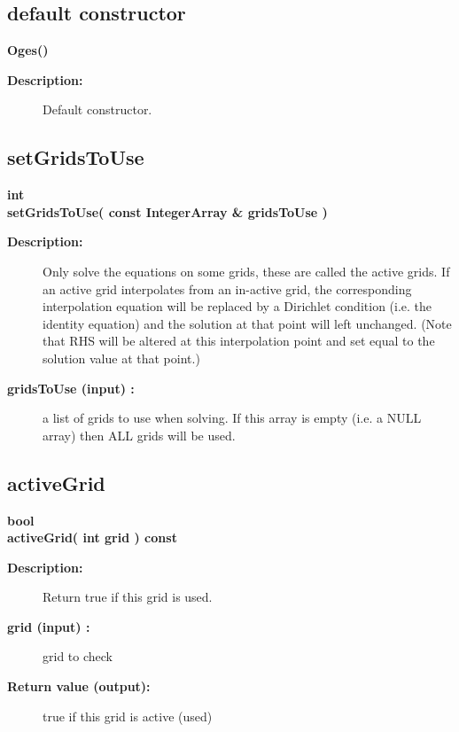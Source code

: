 \subsection{default constructor}
 
\newlength{\OgesIncludeArgIndent}
\begin{flushleft} \textbf{%
\settowidth{\OgesIncludeArgIndent}{Oges(}%
Oges()
}\end{flushleft}
\begin{description}
\item[{\bf Description:}] 
   Default constructor.
\end{description}
\subsection{setGridsToUse}
 
\begin{flushleft} \textbf{%
int  \\ 
\settowidth{\OgesIncludeArgIndent}{setGridsToUse(}%
setGridsToUse( const IntegerArray \& gridsToUse )
}\end{flushleft}
\begin{description}
\item[{\bf Description:}] 
   Only solve the equations on some grids, these are called the active grids. 
 If an active grid interpolates from an in-active grid, the corresponding 
 interpolation equation will be replaced by a Dirichlet condition (i.e. the identity equation)
 and the solution at that point will left unchanged. (Note that RHS will be altered at
 this interpolation point and set equal to the solution value at that point.)

\item[{\bf gridsToUse (input) :}]  a list of grids to use when solving. 
             If this array is empty (i.e. a NULL array) then ALL grids will be used.
              

\end{description}
\subsection{activeGrid}
 
\begin{flushleft} \textbf{%
bool  \\ 
\settowidth{\OgesIncludeArgIndent}{activeGrid(}%
activeGrid( int grid ) const
}\end{flushleft}
\begin{description}
\item[{\bf Description:}] 
   Return true if this grid is used.

\item[{\bf grid (input) :}]  grid to check
\item[{\bf Return value (output):}]  true if this grid is active (used)

\end{description}
